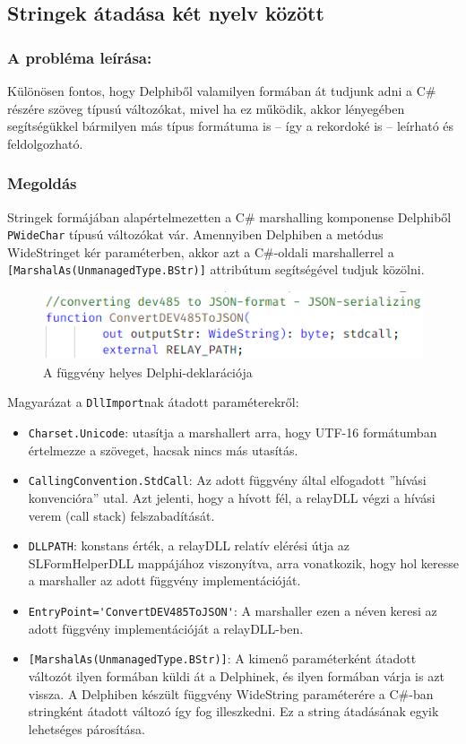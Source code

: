 \documentclass[tocnopagenum]{thesis-ekf}
\begin{document}
	\subsection{Stringek átadása két nyelv között}
	\subsubsection{A probléma leírása:} Különösen fontos, hogy Delphiből valamilyen formában át tudjunk adni a C\# részére szöveg típusú változókat, mivel ha ez működik, akkor lényegében segítségükkel bármilyen más típus formátuma is -- így a rekordoké is -- leírható és feldolgozható.
	
	\subsubsection{Megoldás}
	Stringek formájában alapértelmezetten a C\# marshalling komponense Delphiből \verb*|PWideChar| típusú változókat vár. Amennyiben Delphiben a metódus WideStringet kér paraméterben, akkor azt a C\#-oldali marshallerrel a \verb*|[MarshalAs(UnmanagedType.BStr)]| attribútum segítségével tudjuk közölni.\cite{sof_strhandling}
	
	\begin{figure}[h!]
		\centering
		\includegraphics[scale=0.8]{string_delphi}
		\caption{A függvény helyes Delphi-deklarációja}
		\label{string_delphi}
	\end{figure}

	Magyarázat a \verb*|DllImport|nak átadott paraméterekről:
	\begin{itemize}
		\item \verb*|Charset.Unicode|: utasítja a marshallert arra, hogy UTF-16 formátumban értelmezze a szöveget, hacsak nincs más utasítás.
		\item \verb*|CallingConvention.StdCall|: Az adott függvény által elfogadott ''hívási konvencióra'' utal. Azt jelenti, hogy a hívott fél, a relayDLL végzi a hívási verem (call stack) felszabadítását.
		\item \verb*|DLLPATH|: konstans érték, a relayDLL relatív elérési útja az SLFormHelperDLL mappájához viszonyítva, arra vonatkozik, hogy hol keresse a marshaller az adott függvény implementációját.
		\item \verb*|EntryPoint='ConvertDEV485ToJSON'|: A marshaller ezen a néven keresi az adott függvény implementációját a relayDLL-ben.
		\item \verb*|[MarshalAs(UnmanagedType.BStr)]|: A kimenő paraméterként átadott változót ilyen formában küldi át a Delphinek, és ilyen formában várja is azt vissza. A Delphiben készült függvény WideString paraméterére a C\#-ban stringként átadott változó így fog illeszkedni. Ez a string átadásának egyik lehetséges párosítása.
	\end{itemize}
\end{document}
